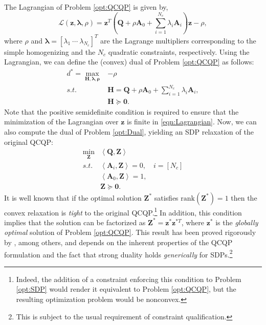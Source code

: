 \documentclass[lettersize,journal]{IEEEtran}
\newcommand{\inner}[2]{\left<#1,#2\right>}
\newcommand{\rank}[1]{\mbox{rank}\left(#1\right)}
\newcommand{\rev}[1]{\color{red}{#1}\color{black}}
\begin{document}
The Lagrangian of Problem \eqref{opt:QCQP} is given by,
\begin{equation}\label{eqn:Lagrangian}
	\mathcal{L}(\bm{z},\bm{\lambda}, \rho) = \bm{z}^T\left(\bm{Q} + \rho\bm{A}_0 +\sum\limits_{i=1}^{N_c} \lambda_i \bm{A}_i\right) \bm{z} - \rho,
\end{equation}
where $ \rho $ and $ \bm{\lambda} = \left[\lambda_1~\cdots~\lambda_{N_c}\right]^T $ are the Lagrange multipliers corresponding to the simple homogenizing and the $N_c$ quadratic constraints, respectively.
Using the Lagrangian, we can define the (convex) dual of Problem \eqref{opt:QCQP} as follows:
\begin{equation}\label{opt:Dual}
	\begin{array}{rl}
		d^*=\max\limits_{\bm{H},\bm{\lambda},\bm{\rho}} &-\rho \\ 
		s.t. & \bm{H} = \bm{Q} + \rho\bm{A}_0 +\sum\limits_{i=1}^{N_c} \lambda_i \bm{A}_i, \\
		& \bm{H} \succeq \bm{0}.
	\end{array}
\end{equation}
Note that the positive semidefinite condition is required to ensure that the minimization of the Lagrangian over $ \bm{z} $ is finite in \eqref{eqn:Lagrangian}. Now, we can also compute the dual of Problem \eqref{opt:Dual}, yielding an SDP relaxation of the original QCQP:
\begin{equation}\label{opt:SDP}
	\begin{array}{rl}
		\min\limits_{\bm{Z}} & \inner{\bm{Q}}{\bm{Z}}\\
		s.t.&\inner{\bm{A}_i}{\bm{Z}}= 0, \quad i = \left[N_c\right]\\
		& \inner{\bm{A}_0}{\bm{Z}}= 1, \\
		& \bm{Z} \succeq \bm{0}.
	\end{array}
\end{equation}
It is well known that if the optimal solution $ \bm{Z}^* $ satisfies $ \rank{\bm{Z}^*}=1 $ then the convex relaxation is \textit{tight} to the original QCQP.\footnote{Indeed, the addition of a constraint enforcing this condition to Problem \eqref{opt:SDP} would render it equivalent to Problem \eqref{opt:QCQP}, but the resulting optimization problem would be nonconvex.} In addition, this condition implies that the solution can be factorized as $ \bm{Z}^* = \bm{z}^* \bm{z}^{*T} $, where $ \bm{z}^* $ is the \textit{globally optimal} solution of Problem \eqref{opt:QCQP}. This result has been proved rigorously by \cite{cifuentesLocalStabilitySemidefinite2022}, among others, and depends on the inherent properties of the QCQP formulation and the fact that strong duality holds \emph{generically} for SDPs.\footnote{This is subject to the usual requirement of constraint qualification. \rev{In our case, we ensure that the SDPs that we solve satisfy the Linear Independent Constraint Qualification.}}
\end{document}

